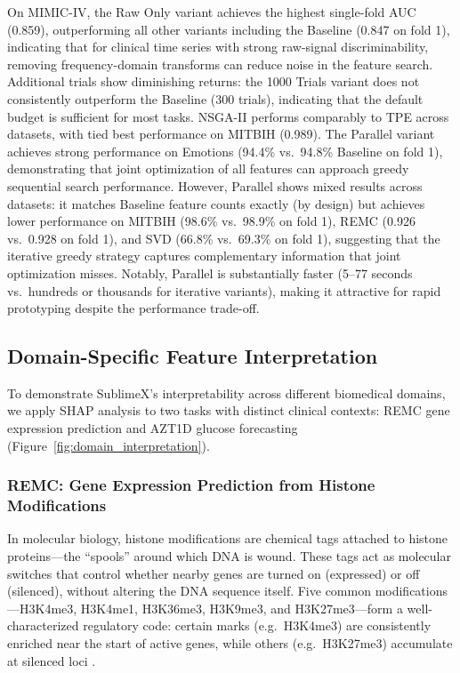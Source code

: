 \documentclass[times, review, 10pt]{elsarticle}
\begin{document}
On MIMIC-IV, the Raw Only variant achieves the highest single-fold AUC (0.859), outperforming all other variants including the Baseline (0.847 on fold 1),
indicating that for clinical time series with strong raw-signal discriminability, removing frequency-domain transforms can reduce noise in the feature search. 
Additional trials show diminishing returns: the 1000 Trials variant does not consistently outperform the Baseline (300 trials), indicating
that the default budget is sufficient for most tasks. NSGA-II performs
comparably to TPE across datasets, with tied best performance on MITBIH
(0.989). The Parallel variant achieves strong performance on Emotions (94.4\%
vs.\ 94.8\% Baseline on fold 1), demonstrating that joint optimization of all
features can approach greedy sequential search performance. However, Parallel
shows mixed results across datasets: it matches Baseline feature counts exactly
(by design) but achieves lower performance on MITBIH (98.6\% vs.\ 98.9\% on
fold 1), REMC (0.926 vs.\ 0.928 on fold 1), and SVD (66.8\% vs.\ 69.3\% on
fold 1), suggesting that the iterative greedy strategy captures complementary
information that joint optimization misses. Notably, Parallel is substantially
faster (5--77 seconds vs.\ hundreds or thousands for iterative variants),
making it attractive for rapid prototyping despite the performance trade-off.

\subsection{Domain-Specific Feature Interpretation}

To demonstrate SublimeX's interpretability across different
biomedical domains, we apply SHAP \cite{lundberg2017unified}
analysis to two tasks with distinct clinical contexts: REMC
gene expression prediction and AZT1D glucose forecasting
(Figure~\ref{fig:domain_interpretation}).

\subsubsection{REMC: Gene Expression Prediction from
Histone Modifications}

In molecular biology, histone modifications are chemical
tags attached to histone proteins---the ``spools'' around
which DNA is wound. These tags act as molecular switches
that control whether nearby genes are turned on (expressed)
or off (silenced), without altering the DNA sequence itself.
Five common modifications---H3K4me3, H3K4me1, H3K36me3,
H3K9me3, and H3K27me3---form a well-characterized
regulatory code: certain marks (e.g.\ H3K4me3) are
consistently enriched near the start of active genes,
while others (e.g.\ H3K27me3) accumulate at silenced loci
\cite{karlic2010histone, howe2017h3k4me3}.
\end{document}
